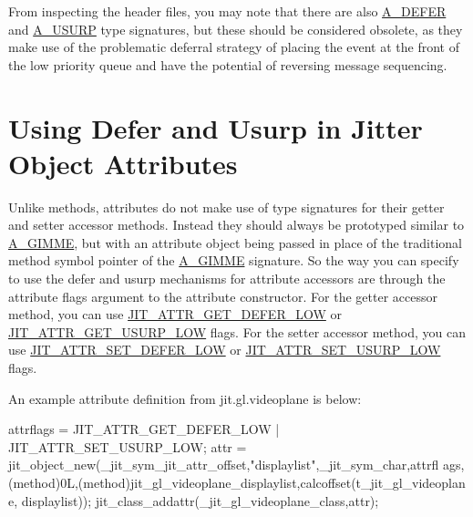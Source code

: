 From inspecting the header files, you may note that there are also \hyperlink{group__atom_gga8aa6700e9f00b132eb376db6e39ade47abcb435e6fecfdcd79276dc8db1988db3}{A\_\-DEFER} and \hyperlink{group__atom_gga8aa6700e9f00b132eb376db6e39ade47af563cdbe6db453f24552bbe7fe6762d8}{A\_\-USURP} type signatures, but these should be considered obsolete, as they make use of the problematic deferral strategy of placing the event at the front of the low priority queue and have the potential of reversing message sequencing.\hypertarget{chapter_jit_sched_chapter_jit_sched_attrs}{}\section{Using Defer and Usurp in Jitter Object Attributes}\label{chapter_jit_sched_chapter_jit_sched_attrs}
Unlike methods, attributes do not make use of type signatures for their getter and setter accessor methods. Instead they should always be prototyped similar to \hyperlink{group__atom_gga8aa6700e9f00b132eb376db6e39ade47a81c1a8550f038db16a619167a70a79b6}{A\_\-GIMME}, but with an attribute object being passed in place of the traditional method symbol pointer of the \hyperlink{group__atom_gga8aa6700e9f00b132eb376db6e39ade47a81c1a8550f038db16a619167a70a79b6}{A\_\-GIMME} signature. So the way you can specify to use the defer and usurp mechanisms for attribute accessors are through the attribute flags argument to the attribute constructor. For the getter accessor method, you can use \hyperlink{group__jitter_ga810447020b75b5173d4c6776cd2653d8}{JIT\_\-ATTR\_\-GET\_\-DEFER\_\-LOW} or \hyperlink{group__jitter_ga07253544f23d315b75f37accf1270a4b}{JIT\_\-ATTR\_\-GET\_\-USURP\_\-LOW} flags. For the setter accessor method, you can use \hyperlink{group__jitter_gaf76b6ca84610d13c1276c51afc2b10ba}{JIT\_\-ATTR\_\-SET\_\-DEFER\_\-LOW} or \hyperlink{group__jitter_ga2ffda4034665d46f65461d67b1004715}{JIT\_\-ATTR\_\-SET\_\-USURP\_\-LOW} flags.

An example attribute definition from jit.gl.videoplane is below:


\begin{DoxyCode}
attrflags = JIT_ATTR_GET_DEFER_LOW | JIT_ATTR_SET_USURP_LOW;
attr = jit_object_new(_jit_sym_jit_attr_offset,"displaylist",_jit_sym_char,attrfl
      ags,
   (method)0L,(method)jit_gl_videoplane_displaylist,calcoffset(t_jit_gl_videoplan
      e, displaylist));   
jit_class_addattr(_jit_gl_videoplane_class,attr);
\end{DoxyCode}



